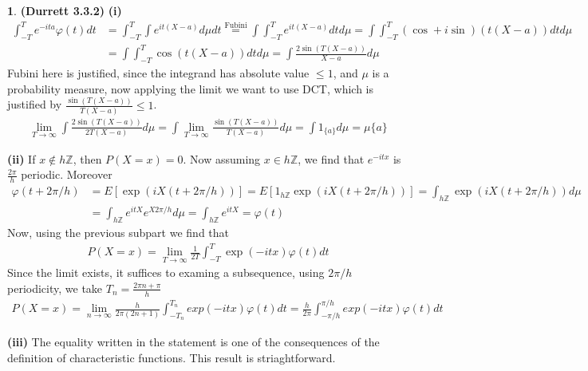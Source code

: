 \documentclass[10.5pt]{article}
\theoremstyle{definition}
\newtheorem{pb}{}
\newcommand{\set}[1]{\{#1\}}
\begin{document}
    \begin{pb}\textbf{(Durrett 3.3.2)} \textbf{(i)}
        \begin{align*}
            \int_{-T}^T e^{-ita}\varphi(t)dt &= \int_{-T}^T \int e^{it(X-a)}d\mu dt \overset{\text{Fubini}}{=} \int\int_{-T}^T e^{it(X-a)}dtd\mu = \int\int_{-T}^T (\cos + i\sin)(t(X-a))dtd\mu \\
            &= \int\int_{-T}^T \cos(t(X-a))dtd\mu = \int \frac{2\sin(T(X-a))}{X-a}d\mu
        \end{align*}
        Fubini here is justified, since the integrand has absolute value \(\leq 1\), and \(\mu\) is a probability measure, now applying the limit we want to use DCT, which is justified by \(\frac{\sin(T(X-a))}{T(X-a)} \leq 1\).
        \begin{align*}
            \lim_{T \to \infty}\int\frac{2\sin(T(X-a))}{2T(X-a)}d\mu = \int\lim_{T\to\infty}\frac{\sin(T(X-a))}{T(X-a)}d\mu = \int1_{\set{a}}d\mu = \mu\set{a}
        \end{align*}

        \textbf{(ii)} If \(x \not \in h \mathbb{Z}\), then \(P(X = x) = 0\). Now assuming \(x \in h \mathbb{Z}\), we find that \(e^{-i t x}\) is \(\frac{2\pi}{h}\) periodic. Moreover
        \begin{align*}
            \varphi(t + 2\pi/h) &= E[\exp(iX(t + 2\pi/h))] = E[1_{h \mathbb{Z}}\exp(iX(t + 2\pi/h))] = \int_{h \mathbb{Z}}\exp(iX(t + 2\pi/h)) d\mu \\
            &= \int_{h \mathbb{Z}}e^{itX}e^{X2\pi/h}d\mu = \int_{h \mathbb{Z}} e^{itX} = \varphi(t)
        \end{align*}
        Now, using the previous subpart we find that
        \begin{align*}
            P(X = x) = \lim_{T \to \infty} \frac{1}{2T}\int_{-T}^T \exp(-i tx)\varphi(t)dt
        \end{align*}
        Since the limit exists, it suffices to examing a subsequence, using \(2\pi/h\) periodicity, we take \(T_n = \frac{2\pi n + \pi}{h}\)
        \begin{align*}
            P(X = x) = \lim_{n\to\infty} \frac{h}{2\pi(2n+1)}\int_{-T_n}^{T_n} exp(-i tx)\varphi(t)dt = \frac{h}{2\pi}\int_{-\pi/h}^{\pi/h} exp(-i tx)\varphi(t)dt
        \end{align*}

        \textbf{(iii)} The equality written in the statement is one of the consequences of the definition of characteristic functions. This result is striaghtforward.
    \end{pb}
\end{document}
